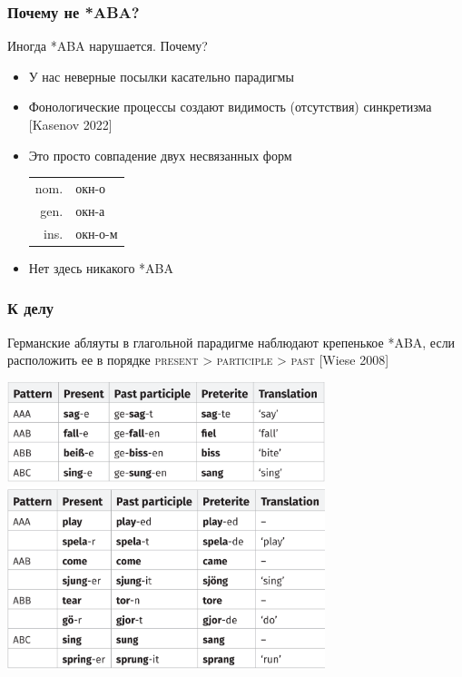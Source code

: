 \documentclass[9pt, t]{beamer}
\begin{document}
\begin{frame}
    \frametitle{Почему не *ABA?}

    Иногда *ABA нарушается. Почему?
    
    \begin{itemize}
        \item У нас неверные посылки касательно парадигмы
        \pause

        \item Фонологические процессы создают видимость (отсутствия) синкретизма [Kasenov 2022]
        
        \pause
        \item Это просто совпадение двух несвязанных форм

        \begin{tabular}{r l}
            nom. &  окн-о\\
            gen. &  окн-а\\
            ins. &  окн-о-м\\
        \end{tabular}

        \pause 
        \item Нет здесь никакого *ABA
    \end{itemize}

\end{frame}

\begin{frame}
    \frametitle{К делу}

    Германские абляуты в глагольной парадигме наблюдают крепенькое *ABA, если расположить ее в порядке \textsc{present} > \textsc{participle} > \textsc{past} [Wiese 2008]

    \includegraphics[width=25em]{images/german proper.png}
    \includegraphics[width=25em]{images/english proper.png}

\end{frame}
\end{document}
